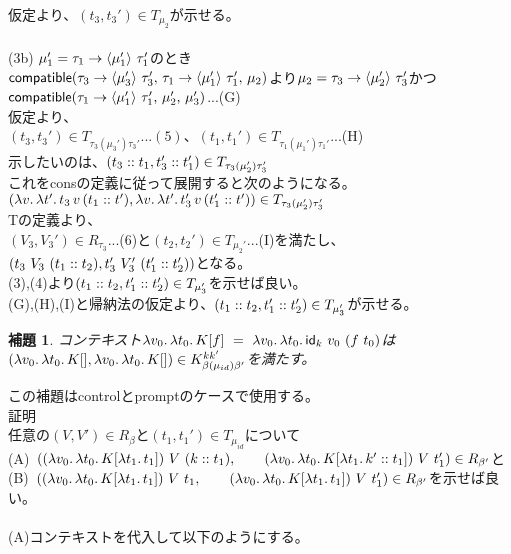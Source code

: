 \documentclass[japanese,draft]{jssst_ppl} %
\newtheorem{lemma}[definition]{補題}
\begin{document}
仮定より、$(t_3,t_3')\in T_{\mu_2}$が示せる。\\
\\
(3b) $\mu_1'=\Trail{\tau_1}{\tau_1'}{\mu_1'}$のとき\\
$\Compatible{\Trail{\tau_3}{\tau_3'}{\mu_3'}}{\Trail{\tau_1}{\tau_1'}{\mu_1'}}{\mu_2}$より$\mu_2 = \Trail{\tau_3}{\tau_3'}{\mu_2'}$かつ$\Compatible{\Trail{\tau_1}{\tau_1'}{\mu_1'}}{\mu_2'}{\mu_3'}$...(G)\\
仮定より、\\
$(t_3, t_3')\in T_{\tau_3(\mu_3')\tau_3'}...(5)、(t_1, t_1')\in T_{\tau_1(\mu_1')\tau_1'}$...(H)\\
示したいのは、$(\Cons{t_3}{t_1}, \Cons{t_3'}{t_1'})\in T_{\tau_3(\mu_2')\tau_3'}$\\これを\textsf{cons}の定義に従って展開すると次のようになる。\\
$(\Lam{v}{\Lam{t'}{t_3\,v\,(\Cons{t_1}{t'})}}, \Lam{v}{\Lam{t'}{t_3'\,v\,(\Cons{t_1'}{t'})}})\in T_{\tau_3(\mu_2')\tau_3'}$\\
Tの定義より、\\
$(V_3,V_3')\in R_{\tau_3}$...(6)と$(t_2,t_2')\in T_{\mu_2'}$...(I)を満たし、$(t_3\ V_3\ (\Cons{t_1}{t_2}),t_3'\ V_3'\ (\Cons{t_1'}{t_2'}))$となる。\\
(3),(4)より$(\Cons{t_1}{t_2},\Cons{t_1'}{t_2'})\in T_{\mu_3'}$を示せば良い。\\
(G),(H),(I)と帰納法の仮定より、$(\Cons{t_1}{t_2},\Cons{t_1'}{t_2'})\in T_{\mu_3'}$が示せる。
\\
\setcounter{definition}{9}
\begin{lemma}
  コンテキスト$\Lam{v_0}{\Lam{t_0}{K[f]}}\ =\ \Lam{v_0}{\Lam{t_0}{\Idk\ v_0\ (f\ t_0)}}$は$(\Lam{v_0}{\Lam{t_0}{K[]}}, \Lam{v_0}{\Lam{t_0}{K[]}})\in  K^{kk'}_{\beta(\mu_{id})\beta'}$を満たす。
\label{IdkContext}
\end{lemma}
この補題はcontrolとpromptのケースで使用する。
\\
\lbrack 証明 \rbrack\\
任意の$(V,V')\in R_{\beta}$と$(t_1,t_1')\in T_{\mu_{id}}$について\\
(A)\ $(\LamP{v_0}{\Lam{t_0}{K[\Lam{t_1}{t_1}]}}\ V\ (\Cons{k}{t_1}),
\qquad \LamP{v_0}{\Lam{t_0}{K[\Lam{t_1}{\Cons{k'}{t_1}}]}}\ V\ t_1')\in R_{\beta'}$と\\
(B)\ $(\LamP{v_0}{\Lam{t_0}{K[\Lam{t_1}{t_1}]}}\ V\ t_1,
\qquad \LamP{v_0}{\Lam{t_0}{K[\Lam{t_1}{t_1}]}}\ V\ t_1')\in R_{\beta'}$を示せば良い。\\
\\
(A)コンテキストを代入して以下のようにする。\\
\end{document}
